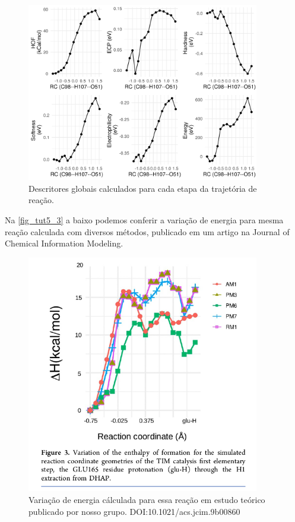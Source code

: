 \documentclass[a4paper,11pt]{refart}
\begin{document}
\hspace*{-\leftmarginwidth}
\begin{minipage}{\fullwidth}
	\begin{figure}[H]
		\begin{center}
			\includegraphics[width=4in]{images/tut6_img2}
			\caption{Descritores globais calculados para cada etapa da trajetória de reação.}
			\label{fig_tut5_2}
		\end{center}
	\end{figure}
\end{minipage}



Na \autoref{fig_tut5_3} a baixo podemos conferir a variação de energia para mesma reação calculada com diversos métodos, publicado em um artigo na Journal of Chemical Information Modeling.


\hspace*{-\leftmarginwidth}
\begin{minipage}{\fullwidth}
	\begin{figure}[H]
		\begin{center}
			\includegraphics[width=4in]{images/tut6_img6}
			\caption{Variação de energia cálculada para essa reação em estudo teórico publicado por nosso grupo. DOI:10.1021/acs.jcim.9b00860}
			\label{fig_tut5_3}
		\end{center}
	\end{figure}
\end{minipage}
\end{document}
